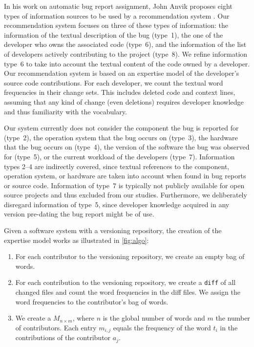 In his work on automatic bug report assignment, John Anvik proposes eight types of information sources to be used by a recommendation system \cite{Anvi06b}. Our recommendation system focuses on three of these types of information: the information of the textual description of the bug (type~1), the one of the developer who owns the associated code (type~6), and the information of the list of developers actively contributing to the project (type~8). We refine information type~6 to take into account the textual content of the code owned by a developer. Our recommendation system is based on an expertise model of the developer's source code contributions. For each developer, we count the textual word frequencies in their change sets. This includes deleted code and context lines, assuming that any kind of change (even deletions) requires developer knowledge and thus familiarity with the vocabulary. 

Our system currently does not consider the component the bug is reported for (type~2), the operation system that the bug occurs on (type~3), the hardware that the bug occurs on (type~4), the version of the software the bug was observed for (type~5), or the current workload of the developers (type~7). Information types 2--4 are indirectly covered, since textual references to the component, operation system, or hardware are taken into account when found in bug reports or source code. Information of type~7 is typically not publicly available for open source projects and thus excluded from our studies. Furthermore, we deliberately disregard information of type~5, since developer knowledge acquired in any version pre-dating the bug report might be of use. 

Given a software system with a versioning repository, the creation of the expertise model works as illustrated in \autoref{fig:algo}:

\begin{enumerate}
\item For each contributor to the versioning repository, we create an empty bag of words. 
\item For each contribution to the versioning repository, we create a \verb$diff$ of all changed files and count the word frequencies in the diff files. We assign the word frequencies to the contributor's bag of words.
\item We create a \TAM $M_{n \times m}$, where $n$ is the global number of words and $m$ the number of contributors. Each entry $m_{i,j}$ equals the frequency of the word $t_i$ in the contributions of the contributor $a_j$. 
\end{enumerate}

